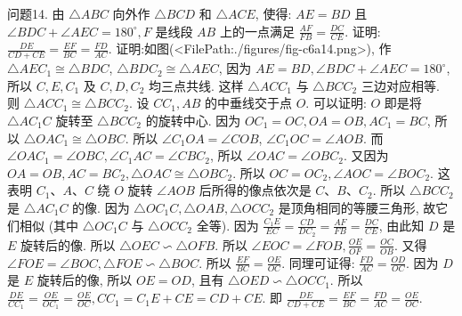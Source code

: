 问题14. 由 $\triangle A B C$ 向外作 $\triangle B C D$ 和 $\triangle A C E$, 使得: $A E=B D$ 且 $\angle B D C+\angle A E C= 180^{\circ}, F$ 是线段 $A B$ 上的一点满足 $\frac{A F}{F B}=\frac{D C}{C E}$. 证明: $\frac{D E}{C D+C E}=\frac{E F}{B C}=\frac{F D}{A C}$.
证明:如图(<FilePath:./figures/fig-c6a14.png>), 作 $\triangle A E C_1 \cong \triangle B D C$, $\triangle B D C_2 \cong \triangle A E C$, 因为 $A E=B D, \angle B D C+ \angle A E C=180^{\circ}$, 所以 $C, E, C_1$ 及 $C, D, C_2$ 均三点共线.
这样 $\triangle A C C_1$ 与 $\triangle B C C_2$ 三边对应相等.
则 $\triangle A C C_1 \cong \triangle B C C_2$.
设 $C C_1, A B$ 的中垂线交于点 $O$. 可以证明: $O$ 即是将 $\triangle A C_1 C$ 旋转至 $\triangle B C C_2$ 的旋转中心.
因为 $O C_1=O C, O A=O B, A C_1=B C$, 所以
$\triangle O A C_1 \cong \triangle O B C$. 所以 $\angle C_1 O A=\angle C O B$, $\angle C_1 O C=\angle A O B$. 而 $\angle O A C_1=\angle O B C, \angle C_1 A C=\angle C B C_2$, 所以 $\angle O A C=\angle O B C_2$. 又因为 $O A=O B, A C=B C_2, \triangle O A C \cong \triangle O B C_2$. 所以
$O C=O C_2, \angle A O C=\angle B O C_2$. 这表明 $C_1 、 A 、 C$ 绕 $O$ 旋转 $\angle A O B$ 后所得的像点依次是 $C 、 B 、 C_2$. 所以 $\triangle B C C_2$ 是 $\triangle A C_1 C$ 的像.
因为 $\triangle O C_1 C, \triangle O A B, \triangle O C C_2$ 是顶角相同的等腰三角形, 故它们相似 (其中 $\triangle O C_1 C$ 与 $\triangle O C C_2$ 全等). 因为 $\frac{C_1 E}{E C}=\frac{C D}{D C_2}=\frac{A F}{F B}=\frac{D C}{C E}$, 由此知 $D$ 是 $E$ 旋转后的像.
所以 $\triangle O E C \backsim \triangle O F B$. 所以 $\angle E O C=\angle F O B, \frac{O E}{O F}=\frac{O C}{O B}$. 又得 $\angle F O E=\angle B O C, \triangle F O E \backsim \triangle B O C$. 所以 $\frac{E F}{B C}=\frac{O E}{O C}$. 同理可证得: $\frac{F D}{A C}=\frac{O D}{O C}$.
因为 $D$ 是 $E$ 旋转后的像, 所以 $O E=O D$, 且有 $\triangle O E D \backsim \triangle O C C_1$.
所以 $\frac{D E}{C C_1}=\frac{O E}{O C_1}=\frac{O E}{O C}, C C_1=C_1 E+C E=C D+C E$. 即 $\frac{D E}{C D+C E}=\frac{E F}{B C}= \frac{F D}{A C}=\frac{O E}{O C}$.



